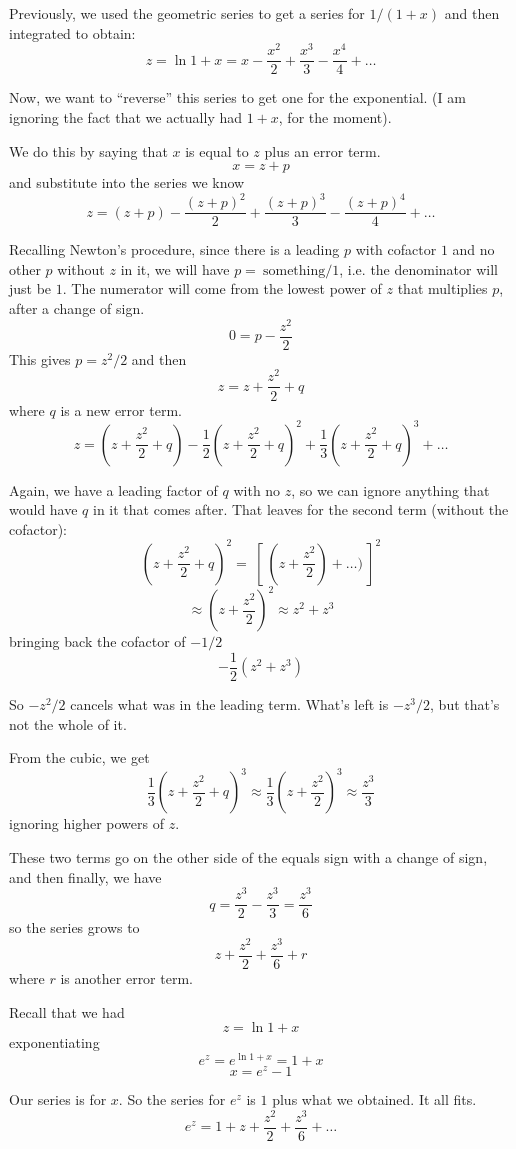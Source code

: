 \documentclass[11pt, oneside]{article}
\begin{document}
Previously, we used the geometric series to get a series for $1/(1 + x)$ and then integrated to obtain: 
\[ z = \ln 1 + x = x - \frac{x^2}{2} + \frac{x^3}{3} - \frac{x^4}{4} + \dots \]

Now, we want to ``reverse'' this series to get one for the exponential.  
(I am ignoring the fact that we actually had $1 + x$, for the moment).

We do this by saying that $x$ is equal to $z$ plus an error term.
\[ x = z + p \]
and substitute into the series we know
\[ z = (z + p) - \frac{(z + p)^2}{2} + \frac{(z + p)^3}{3} - \frac{(z + p)^4}{4} + \dots \]

Recalling Newton's procedure, since there is a leading $p$ with cofactor $1$ and no other $p$ without $z$ in it, we will have $p = \ \text{something}/1$, i.e. the denominator will just be $1$.  The numerator will come from the lowest power of $z$ that multiplies $p$, after a change of sign.
\[ 0 = p - \frac{z^2}{2} \]
This gives $p = z^2/2$ and then
\[ z = z +  \frac{z^2}{2} + q \]
where $q$ is a new error term.
\[ z = (z +  \frac{z^2}{2} + q) - \frac{1}{2} (z +  \frac{z^2}{2} + q)^2 + \frac{1}{3} (z +  \frac{z^2}{2} + q)^3 +  \dots \]

Again, we have a leading factor of $q$ with no $z$, so we can ignore anything that would have $q$ in it that comes after.  That leaves for the second term (without the cofactor):
\[  (z +  \frac{z^2}{2} + q)^2 =  \ [ \ (z + \frac{z^2}{2}) + \dots) \ ]^2 \]
\[ \approx (z + \frac{z^2}{2})^2 \approx z^2 + z^3 \]
bringing back the cofactor of $-1/2$ 
\[ -\frac{1}{2}( z^2 + z^3) \]

So $-z^2/2$ cancels what was in the leading term.  What's left is $-z^3/2$, but that's not the whole of it.

From the cubic, we get 
\[ \frac{1}{3} (z +  \frac{z^2}{2} + q)^3 \approx \frac{1}{3}(z + \frac{z^2}{2})^3 \approx \frac{z^3}{3} \]
ignoring higher powers of $z$.

These two terms go on the other side of the equals sign with a change of sign, and then finally, we have
\[ q = \frac{z^3}{2} - \frac{z^3}{3} = \frac{z^3}{6} \]
so the series grows to
\[ z +  \frac{z^2}{2} + \frac{z^3}{6} + r \]
where $r$ is another error term.

Recall that we had
\[ z = \ln 1 + x \]
exponentiating
\[ e^z = e^{\ln 1 + x} = 1 + x \]
\[ x = e^z - 1 \]

Our series is for $x$.  So the series for $e^z$ is $1$ plus what we obtained.  It all fits.
\[ e^z = 1 + z +  \frac{z^2}{2} + \frac{z^3}{6} + \dots \]
\end{document}
